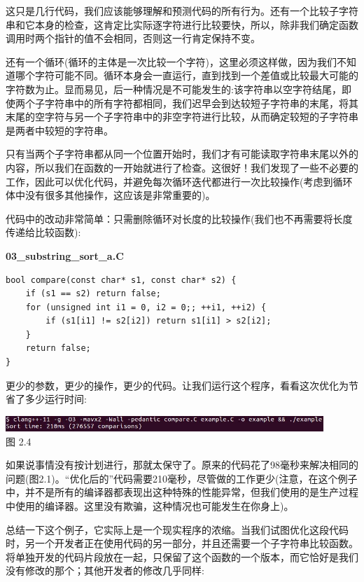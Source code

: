 这只是几行代码，我们应该能够理解和预测代码的所有行为。还有一个比较子字符串和它本身的检查，这肯定比实际逐字符进行比较要快，所以，除非我们确定函数调用时两个指针的值不会相同，否则这一行肯定保持不变。

还有一个循环(循环的主体是一次比较一个字符)，这里必须这样做，因为我们不知道哪个字符可能不同。循环本身会一直运行，直到找到一个差值或比较最大可能的字符数为止。显而易见，后一种情况是不可能发生的:该字符串以空字符结尾，即使两个子字符串中的所有字符都相同，我们迟早会到达较短子字符串的末尾，将其末尾的空字符与另一个子字符串中的非空字符进行比较，从而确定较短的子字符串是两者中较短的字符串。

只有当两个子字符串都从同一个位置开始时，我们才有可能读取字符串末尾以外的内容，所以我们在函数的一开始就进行了检查。这很好！我们发现了一些不必要的工作，因此可以优化代码，并避免每次循环迭代都进行一次比较操作(考虑到循环体中没有很多其他操作，这应该是非常重要的)。

代码中的改动非常简单：只需删除循环对长度的比较操作(我们也不再需要将长度传递给比较函数):

\noindent
\textbf{03\_substring\_sort\_a.C}
\begin{lstlisting}[style=styleCXX]
bool compare(const char* s1, const char* s2) {
	if (s1 == s2) return false;
	for (unsigned int i1 = 0, i2 = 0;; ++i1, ++i2) {
		if (s1[i1] != s2[i2]) return s1[i1] > s2[i2];
	}
	return false;
}
\end{lstlisting}

更少的参数，更少的操作，更少的代码。让我们运行这个程序，看看这次优化为节省了多少运行时间:

\begin{center}
\includegraphics[width=0.9\textwidth]{content/1/chapter2/images/4.jpg}\\
图 2.4
\end{center}

如果说事情没有按计划进行，那就太保守了。原来的代码花了98毫秒来解决相同的问题(图2.1)。“优化后的”代码需要210毫秒，尽管做的工作更少(注意，在这个例子中，并不是所有的编译器都表现出这种特殊的性能异常，但我们使用的是生产过程中使用的编译器。这里没有欺骗，这种情况也可能发生在你身上)。

总结一下这个例子，它实际上是一个现实程序的浓缩。当我们试图优化这段代码时，另一个开发者正在使用代码的另一部分，并且还需要一个子字符串比较函数。将单独开发的代码片段放在一起，只保留了这个函数的一个版本，而它恰好是我们没有修改的那个；其他开发者的修改几乎同样:

